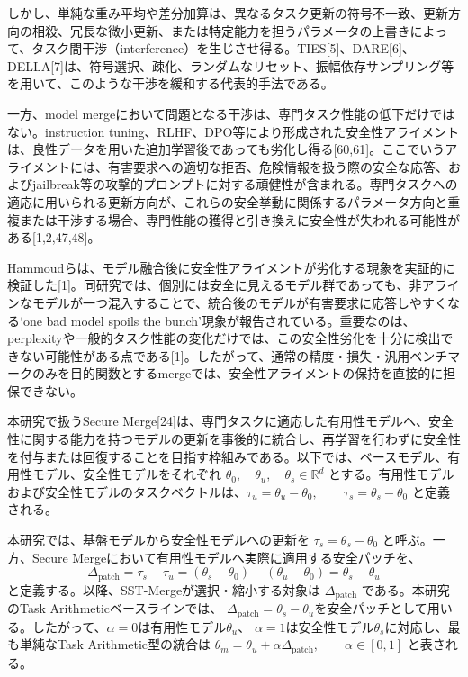 \documentclass{article}
\begin{document}
しかし、単純な重み平均や差分加算は、異なるタスク更新の符号不一致、更新方向の相殺、冗長な微小更新、または特定能力を担うパラメータの上書きによって、タスク間干渉（interference）を生じさせ得る。TIES[5]、DARE[6]、DELLA[7]は、符号選択、疎化、ランダムなリセット、振幅依存サンプリング等を用いて、このような干渉を緩和する代表的手法である。

一方、model mergeにおいて問題となる干渉は、専門タスク性能の低下だけではない。instruction tuning、RLHF、DPO等により形成された安全性アライメントは、良性データを用いた追加学習後であっても劣化し得る[60,61]。ここでいうアライメントには、有害要求への適切な拒否、危険情報を扱う際の安全な応答、およびjailbreak等の攻撃的プロンプトに対する頑健性が含まれる。専門タスクへの適応に用いられる更新方向が、これらの安全挙動に関係するパラメータ方向と重複または干渉する場合、専門性能の獲得と引き換えに安全性が失われる可能性がある[1,2,47,48]。

Hammoudらは、モデル融合後に安全性アライメントが劣化する現象を実証的に検証した[1]。同研究では、個別には安全に見えるモデル群であっても、非アラインなモデルが一つ混入することで、統合後のモデルが有害要求に応答しやすくなる`one bad model spoils the bunch'現象が報告されている。重要なのは、perplexityや一般的タスク性能の変化だけでは、この安全性劣化を十分に検出できない可能性がある点である[1]。したがって、通常の精度・損失・汎用ベンチマークのみを目的関数とするmergeでは、安全性アライメントの保持を直接的に担保できない。

本研究で扱うSecure Merge[24]は、専門タスクに適応した有用性モデルへ、安全性に関する能力を持つモデルの更新を事後的に統合し、再学習を行わずに安全性を付与または回復することを目指す枠組みである。以下では、ベースモデル、有用性モデル、安全性モデルをそれぞれ \(\theta_0,\quad \theta_u,\quad \theta_s \in \mathbb{R}^d\) とする。有用性モデルおよび安全性モデルのタスクベクトルは、\(\tau_u = \theta_u - \theta_0,\qquad \tau_s = \theta_s - \theta_0\) と定義される。

本研究では、基盤モデルから安全性モデルへの更新を \(\tau_s=\theta_s-\theta_0\) と呼ぶ。一方、Secure Mergeにおいて有用性モデルへ実際に適用する安全パッチを、
\[
\Delta_{\mathrm{patch}} = \tau_s - \tau_u = (\theta_s - \theta_0) - (\theta_u - \theta_0) = \theta_s-\theta_u
\]
と定義する。以降、SST-Mergeが選択・縮小する対象は \(\Delta_{\mathrm{patch}}\) である。本研究のTask Arithmeticベースラインでは、 \(\Delta_{\mathrm{patch}}=\theta_s-\theta_u\)を安全パッチとして用いる。したがって、\(\alpha=0\)は有用性モデル\(\theta_u\)、 \(\alpha=1\)は安全性モデル\(\theta_s\)に対応し、最も単純なTask Arithmetic型の統合は \(\theta_m = \theta_u + \alpha \Delta_{\mathrm{patch}},\qquad \alpha \in [0,1]\) と表される。
\end{document}
